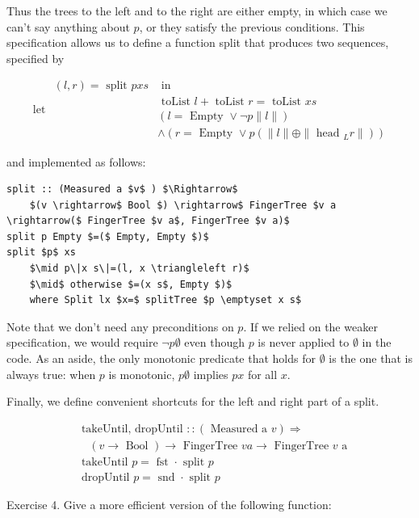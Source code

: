 \documentclass[10pt]{article}
\begin{document}
Thus the trees to the left and to the right are either empty, in which case we can't say anything about $p$, or they satisfy the previous conditions. This specification allows us to define a function split that produces two sequences, specified by

$$
\text { let } \begin{aligned}
(l, r)=\text { split } p x s & \text { in } \\
& \text { toList } l+\text { toList } r=\text { toList } x s \\
& (l=\text { Empty } \vee \neg p\|l\|) \\
& \wedge\left(r=\text { Empty } \vee p\left(\|l\| \oplus \| \text { head }_{L} r \|\right)\right)
\end{aligned}
$$

and implemented as follows:

\begin{verbatim}
split :: (Measured a $v$ ) $\Rightarrow$
    $(v \rightarrow$ Bool $) \rightarrow$ FingerTree $v a \rightarrow($ FingerTree $v a$, FingerTree $v a)$
split p Empty $=($ Empty, Empty $)$
split $p$ xs
    $\mid p\|x s\|=(l, x \triangleleft r)$
    $\mid$ otherwise $=(x s$, Empty $)$
    where Split lx $x=$ splitTree $p \emptyset x s$
\end{verbatim}

Note that we don't need any preconditions on $p$. If we relied on the weaker specification, we would require $\neg p \emptyset$ even though $p$ is never applied to $\emptyset$ in the code. As an aside, the only monotonic predicate that holds for $\emptyset$ is the one that is always true: when $p$ is monotonic, $p \emptyset$ implies $p x$ for all $x$.

Finally, we define convenient shortcuts for the left and right part of a split.

$$
\begin{aligned}
& \text { takeUntil, dropUntil }::(\text { Measured a } v) \Rightarrow \\
& \quad(v \rightarrow \text { Bool }) \rightarrow \text { FingerTree } v a \rightarrow \text { FingerTree } v \text { a } \\
& \text { takeUntil } p=\text { fst } \cdot \text { split } p \\
& \text { dropUntil } p=\text { snd } \cdot \text { split } p
\end{aligned}
$$

Exercise 4. Give a more efficient version of the following function:
\end{document}
